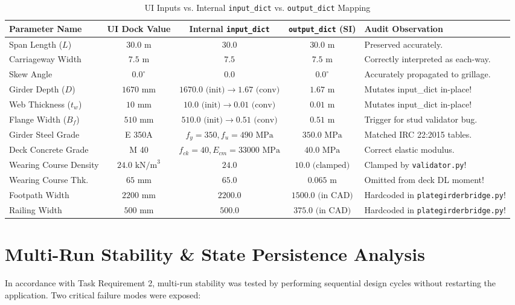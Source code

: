 \documentclass[11pt,a4paper]{article}
\begin{document}
\begin{table}[h!]
\centering
\footnotesize
\caption{UI Inputs vs. Internal \texttt{input\_dict} vs. \texttt{output\_dict} Mapping}
\begin{tabularx}{\linewidth}{l c c c p{4cm}}
\toprule
\textbf{Parameter Name} & \textbf{UI Dock Value} & \textbf{Internal \texttt{input\_dict}} & \textbf{\texttt{output\_dict} (SI)} & \textbf{Audit Observation} \\
\midrule
Span Length ($L$) & $30.0\text{ m}$ & $30.0$ & $30.0\text{ m}$ & Preserved accurately. \\
Carriageway Width & $7.5\text{ m}$ & $7.5$ & $7.5\text{ m}$ & Correctly interpreted as each-way. \\
Skew Angle & $0.0^\circ$ & $0.0$ & $0.0^\circ$ & Accurately propagated to grillage. \\
Girder Depth ($D$) & $1670\text{ mm}$ & $1670.0\text{ (init)} \to 1.67\text{ (conv)}$ & $1.67\text{ m}$ & Mutates input\_dict in-place! \\
Web Thickness ($t_w$) & $10\text{ mm}$ & $10.0\text{ (init)} \to 0.01\text{ (conv)}$ & $0.01\text{ m}$ & Mutates input\_dict in-place! \\
Flange Width ($B_f$) & $510\text{ mm}$ & $510.0\text{ (init)} \to 0.51\text{ (conv)}$ & $0.51\text{ m}$ & Trigger for stud validator bug. \\
Girder Steel Grade & E 350A & $f_y=350, f_u=490\text{ MPa}$ & $350.0\text{ MPa}$ & Matched IRC 22:2015 tables. \\
Deck Concrete Grade & M 40 & $f_{ck}=40, E_{cm}=33000\text{ MPa}$ & $40.0\text{ MPa}$ & Correct elastic modulus. \\
Wearing Course Density & $24.0\text{ kN/m}^3$ & $24.0$ & $10.0\text{ (clamped)}$ & Clamped by \texttt{validator.py}! \\
Wearing Course Thk. & $65\text{ mm}$ & $65.0$ & $0.065\text{ m}$ & Omitted from deck DL moment! \\
Footpath Width & $2200\text{ mm}$ & $2200.0$ & $1500.0\text{ (in CAD)}$ & Hardcoded in \texttt{plategirderbridge.py}! \\
Railing Width & $500\text{ mm}$ & $500.0$ & $375.0\text{ (in CAD)}$ & Hardcoded in \texttt{plategirderbridge.py}! \\
\bottomrule
\end{tabularx}
\end{table}

\section{Multi-Run Stability \& State Persistence Analysis}
In accordance with Task Requirement 2, multi-run stability was tested by performing sequential design cycles without restarting the application. Two critical failure modes were exposed:
\end{document}
